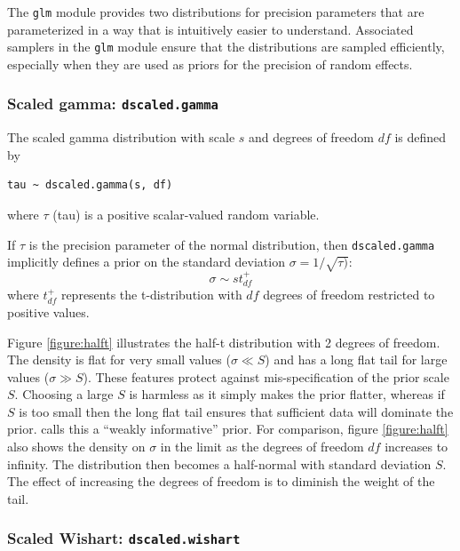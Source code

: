 \documentclass[11pt, a4paper, titlepage]{report}
\begin{document}
The \texttt{glm} module provides two distributions for precision
parameters that are parameterized in a way that is intuitively easier
to understand. Associated samplers in the \texttt{glm} module ensure
that the distributions are sampled efficiently, especially when they
are used as priors for the precision of random effects.

\subsubsection{Scaled gamma: \texttt{dscaled.gamma}}

The scaled gamma distribution with scale $s$ and degrees of freedom $df$
is defined by
\begin{verbatim}
tau ~ dscaled.gamma(s, df)
\end{verbatim}
where $\tau$ (tau) is a positive scalar-valued random variable.

If $\tau$ is the precision parameter of the normal distribution, then
\texttt{dscaled.gamma} implicitly defines a prior on the standard
deviation $\sigma = 1/\sqrt{\tau)}$:
\[
\sigma \sim s t_{df}^{+}
\]
where $t_{df}^{+}$ represents the t-distribution with $df$ degrees of
freedom restricted to positive values.

Figure \ref{figure:halft} illustrates the half-t distribution with 2
degrees of freedom. The density is flat for very small values ($\sigma
\ll S$) and has a long flat tail for large values ($\sigma \gg
S$). These features protect against mis-specification of the prior
scale $S$.  Choosing a large $S$ is harmless as it simply makes the
prior flatter, whereas if $S$ is too small then the long flat tail
ensures that sufficient data will dominate the
prior. \citet{Gelman2006} calls this a ``weakly informative''
prior. For comparison, figure \ref{figure:halft} also shows the
density on $\sigma$ in the limit as the degrees of freedom $df$
increases to infinity. The distribution then becomes a half-normal
with standard deviation $S$. The effect of increasing the degrees of
freedom is to diminish the weight of the tail.


\subsubsection{Scaled Wishart: \texttt{dscaled.wishart}}
\end{document}
